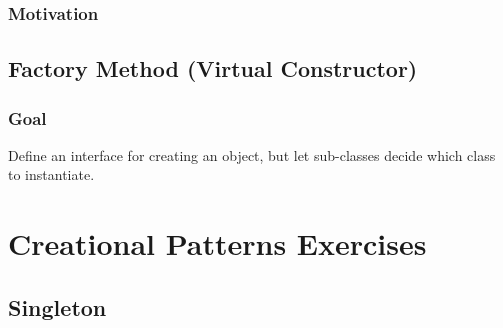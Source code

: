 \documentclass{article}
\begin{document}
\subsubsection{Motivation}



\subsection{Factory Method (Virtual Constructor)}
\subsubsection{Goal}
Define an interface for creating an object, but let sub-classes decide which class to instantiate.




\section{Creational Patterns Exercises}
\subsection{Singleton}



\clearpage






\nocite{*}
\end{document}
